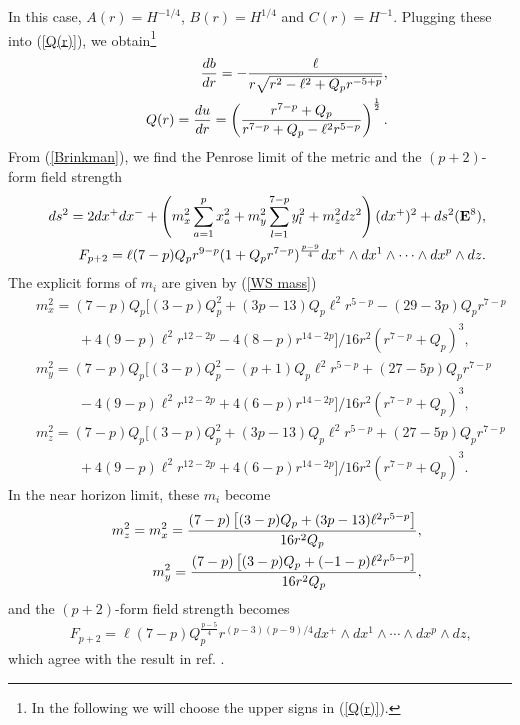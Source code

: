 \documentclass[a4paper,12pt]{article}
\begin{document}
In this case, $A(r)=H^{-1/4}$, $B(r)=H^{1/4}$ and $C(r)=H^{-1}$.
Plugging these into (\ref{Q(r)}),
we obtain\footnote{
In the following we will choose 
the upper signs in (\ref{Q(r)}).
}
\begin{eqnarray}
&&\frac{db}{dr}=-\frac{\ell}{r\sqrt{r^2-\ell^2+Q_pr^{-5+p}}}, \nonumber
\\
&&Q(r)=\frac{du}{dr}=\left({r^{7-p}+Q_{p}\over r^{7-p}+Q_{p}
-\ell^2 r^{5-p}}\right)^{1\over2}.
\label{QDp}
\end{eqnarray}
From (\ref{Brinkman}), 
we find the Penrose limit of the metric and the $(p+2)$-form field strength
\begin{eqnarray}
&&ds^2=2dx^+dx^-+\left(
m_x^2\sum_{a=1}^{p}x_a^2 +m_y^2\sum_{l=1}^{7-p}y_l^2
+m_z^2dz^2
\right)(dx^+)^2
+ds^2({\bf E}^{8}),\nonumber \\
&&
F_{p+2}=\ell (7-p)Q_pr^{9-p}(1+Q_pr^{7-p})^{\frac{p-9}{4}}
dx^+\wedge dx^1\wedge \cdots \wedge dx^p\wedge dz.
\end{eqnarray}
The explicit forms of $m_i$ are given by (\ref{WS mass})
\begin{eqnarray}
&&m_x^2=(7-p)Q_{p}\Biggl[
(3-p)Q_{p}^2+(3p-13)Q_{p}\ell^2 r^{5-p}-(29-3p)Q_{p}r^{7-p}
\nonumber \\
&&\quad\quad\quad
+4(9-p)\ell^2 r^{12-2p}-4(8-p)r^{14-2p}
\Biggr]\bigg/ 16 r^2(r^{7-p}+Q_{p})^3,
\nonumber \\
&&m_y^2=(7-p)Q_{p}\Biggl[
(3-p)Q_{p}^2-(p+1)Q_{p}\ell^2 r^{5-p}+(27-5p)Q_{p}r^{7-p}
\nonumber \\
&&\quad\quad\quad
-4(9-p)\ell^2 r^{12-2p}+4(6-p)r^{14-2p}
\Biggr]\bigg/ 16 r^2(r^{7-p}+Q_{p})^3,
\nonumber \\
&&m_z^2=(7-p)Q_{p}\Biggl[
(3-p)Q_{p}^2+(3p-13)Q_{p}\ell^2 r^{5-p}+(27-5p)Q_{p}r^{7-p}
\nonumber \\
&&\quad\quad\quad
+4(9-p)\ell^2 r^{12-2p}+4(6-p)r^{14-2p}
\Biggr]\bigg/ 16 r^2(r^{7-p}+Q_{p})^3.
\label{eq:dpmass}
\end{eqnarray}
In the near horizon limit, these $m_i$ become
\begin{eqnarray}
&&m_{z}^{2}
=m_{x}^2=
{(7-p)\left[
(3-p)Q_{p}+(3p-13)\ell^2 r^{5-p}
\right]\over 16 r^2 Q_{p}},
\nonumber\\
&&m_{y}^{2}
=
{(7-p)\left[
(3-p)Q_{p}+(-1-p)\ell^2 r^{5-p}
\right]\over 16 r^2 Q_{p}},
\label{eq:nhDpmass}
\end{eqnarray}
and the $(p+2)$-form field strength becomes 
\begin{eqnarray}
&&
F_{p+2}=\ell (7-p)Q_p^{\frac{p-5}{4}}r^{(p-3)(p-9)/4}dx^{+}\wedge
dx^1\wedge \cdots \wedge dx^{p}\wedge dz,
\end{eqnarray}
which agree with the result in ref. \cite{GiPaSo}.
\end{document}
